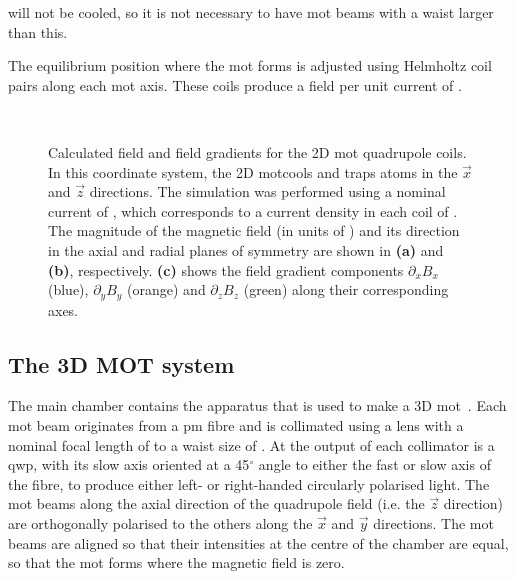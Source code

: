 will not be cooled, so it is not necessary to have \ac{mot} beams with
a waist larger than this. \par\noindent
The equilibrium position where the \ac{mot} forms is adjusted using
Helmholtz coil pairs along each \ac{mot} axis. These coils produce a
field per unit current of
.
\begin{figure}[htbp!]
	\centering
	\def\svgwidth{\columnwidth}
  \\
	\caption[Calculated field and field gradients for the 2D \ac{mot} quadrupole
		coils]{Calculated field and field gradients for the 2D \ac{mot}
		quadrupole coils. In this coordinate system, the 2D \ac{mot}cools and
		traps atoms in the \(\vec{x}\) and \(\vec{z}\) directions. The
		simulation was performed using a nominal current of
		, which corresponds to a current density in each
		coil of . The magnitude of
		the magnetic field (in units of \sivalue{}{\gauss}) and its direction in
		the axial and radial planes of symmetry are shown in \textbf{(a)} and
		\textbf{(b)}, respectively. \textbf{(c)} shows the field gradient
		components \(\partial_x B_x\) (blue), \(\partial_y B_y\) (orange) and
		\(\partial_z B_z\) (green) along their corresponding axes.}
	\label{fig:2d_mot_field_gradient}
\end{figure}
\subsection{The 3D MOT system}\label{sec:3d_mot}
The main chamber contains the apparatus that is used to make a 3D
\ac{mot}~\cite{Raab1987}. Each \ac{mot} beam originates from a \ac{pm} fibre and is collimated using a
lens with a nominal focal length of  to a waist size of . At the output
of each collimator is a \ac{qwp}, with its slow axis oriented at a 45\(^\circ\)
angle to either the fast or slow axis of the fibre, to produce either left- or right-handed circularly polarised light. The \ac{mot} beams along the axial direction of the quadrupole field
(i.e. the \(\vec{z}\) direction) are orthogonally
polarised to the others along the \(\vec{x}\) and \(\vec{y}\) directions. The \ac{mot} beams are aligned so that their intensities at the centre of the chamber are equal, so that the \ac{mot} forms where the magnetic field is zero.
